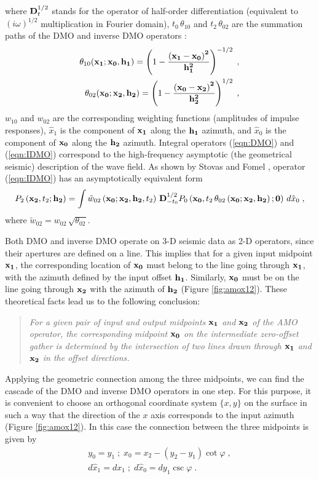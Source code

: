 where ${\bf D}_t^{1/2}$ stands for the operator of half-order differentiation
(equivalent to $(i \omega)^{1/2}$ multiplication in Fourier domain),
$t_0\, \theta_{10}$ and $t_2\,\theta_{02}$ are the summation paths of
the DMO and inverse DMO  
operators \cite{GPR29.03.03740406}:
\begin{eqnarray}
\theta_{10}({\bf x_1;x_0, h_1})=
\left(1-{\bf \left(x_1-x_0\right)^2 \over h_1^2}\right)^{-1/2}\;,
\label{eqn:DMOtt}\\
\theta_{02}({\bf x_0;x_2, h_2})=
\left(1-{\bf \left(x_0-x_2\right)^2 \over h_2^2}\right)^{1/2}\;,
\label{eqn:IDMOtt}
\end{eqnarray}
$w_{10}$ and $w_{02}$ are the corresponding weighting functions (amplitudes of
impulse responses), $\hat{x}_1$ is the component of ${\bf x_1}$ along the
${\bf h_1}$ azimuth, and $\hat{x}_0$ is the component of ${\bf x_0}$
along the
${\bf h_2}$ azimuth. 
Integral operators (\ref{eqn:DMO}) and (\ref{eqn:IDMO}) correspond to
the high-frequency asymptotic (the geometrical seismic) description of
the wave field. As shown by Stovas and Fomel , 
operator (\ref{eqn:IDMO}) has an asymptotically equivalent
form
\begin{equation}
P_2\left({\bf x_2},t_2;{\bf h_2}\right)=\int 
\tilde{w}_{02}\left({\bf x_0;x_2, h_2},t_2\right)\,
{\bf D}_{-t_0}^{1/2}P_0\left({\bf x_0},t_2\,\theta_{02}
\left({\bf x_0;x_2, h_2}\right);
{\bf 0}\right)\,d\hat{x}_0\;,
\label{eqn:tIDMO}
\end{equation}
where $\tilde{w}_{02}=w_{02}\,\sqrt{\theta_{02}}$.
\par
Both DMO and inverse DMO operate on 3-D seismic data
as 2-D operators, since their apertures are defined on a line. This
implies that for a given input midpoint ${\bf x_1}$, the corresponding
location of ${\bf x_0}$ must belong to the
line going through ${\bf x_1}$, with the azimuth defined by the input
offset ${\bf h_1}$. 
Similarly, ${\bf x_0}$ must be on the line going through 
${\bf x_2}$ with the azimuth of ${\bf h_2}$ (Figure \ref{fig:amox12}).
These theoretical facts lead us to the following conclusion: 
\begin{quote}
{\em For a given pair of input and output midpoints ${\bf x_1}$ and ${\bf x_2}$
of the AMO operator, the corresponding midpoint ${\bf x_0}$ on
the intermediate zero-offset gather is determined by the  intersection of 
two lines drawn
through ${\bf x_1}$ and ${\bf x_2}$
in the offset directions.} 
\end{quote}
Applying the geometric connection among the three midpoints, we can
find the cascade 
of the DMO
and inverse DMO operators in one step.
For this purpose, it is convenient to choose an orthogonal coordinate
system $\{x,y\}$ on the 
surface in such a way that the direction of the $x$ axis corresponds
to the input azimuth 
(Figure \ref{fig:amox12}).
In this case the connection between the three midpoints is given by
\begin{eqnarray}
y_0=y_1\;;\;x_0=x_2-\left(y_2-y_1\right) \cot{\varphi}\;,
\label{eqn:x012}\\
d\hat{x}_1=dx_1\;;\;d\hat{x}_0=dy_1 \csc{\varphi}\;.
\label{eqn:jacob}
\end{eqnarray}

